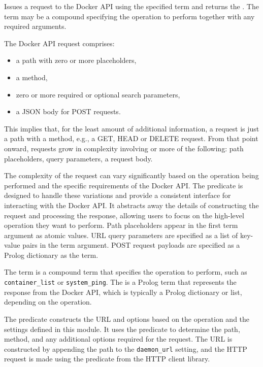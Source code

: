 \begin{description}
Issues a request to the Docker API using the specified  term and
returns the . The  term may be a compound specifying the
operation to perform together with any required arguments.

The Docker API request comprises:

\begin{itemize}
    \item a path with zero or more placeholders,
    \item a method,
    \item zero or more required or optional search parameters,
    \item a JSON body for POST requests.
\end{itemize}

This implies that, for the least amount of additional information, a
request is just a path with a method, e.g., a GET, HEAD or DELETE
request. From that point onward, requests grow in complexity
involving or more of the following: path placeholders, query
parameters, a request body.

The complexity of the request can vary significantly based on the
operation being performed and the specific requirements of the
Docker API. The  predicate is designed to handle these
variations and provide a consistent interface for interacting with
the Docker API. It abstracts away the details of constructing the
request and processing the response, allowing users to focus on the
high-level operation they want to perform. Path placeholders appear
in the first  term argument as atomic values. URL query
parameters are specified as a list of key-value pairs in the 
term argument. POST request payloads are specified as a Prolog
dictionary as the  term.

The  term is a compound term that specifies the operation to
perform, such as \verb$container_list$ or \verb$system_ping$. The  is a
Prolog term that represents the response from the Docker API, which
is typically a Prolog dictionary or list, depending on the
operation.

The predicate constructs the URL and options based on the operation
and the settings defined in this module. It uses the 
predicate to determine the path, method, and any additional options
required for the request. The URL is constructed by appending the
path to the \verb$daemon_url$ setting, and the HTTP request is made using
the  predicate from the HTTP client library.


\end{description}
